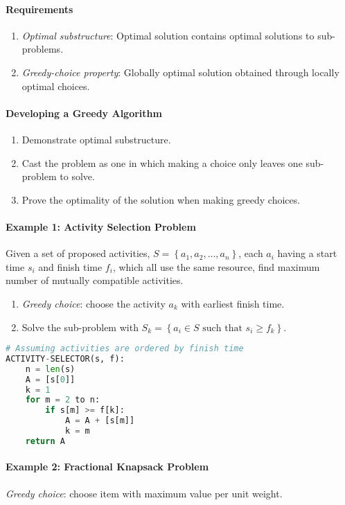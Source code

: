 \documentclass[twocolumn,english]{article}
\begin{document}
\paragraph{Requirements}
\begin{enumerate}
\item \emph{Optimal substructure}: Optimal solution contains optimal solutions
to sub-problems.
\item \emph{Greedy-choice property}: Globally optimal solution obtained
through locally optimal choices.
\end{enumerate}

\paragraph{Developing a Greedy Algorithm}
\begin{enumerate}
\item Demonstrate optimal substructure.
\item Cast the problem as one in which making a choice only leaves one sub-problem
to solve.
\item Prove the optimality of the solution when making greedy choices.
\end{enumerate}

\paragraph{Example 1: Activity Selection Problem}

Given a set of proposed activities, $S=\left\{ a_{1},a_{2},\dots,a_{n}\right\} $,
each $a_{i}$ having a start time $s_{i}$ and finish time $f_{i}$,
which all use the same resource, find maximum number of mutually compatible
activities.
\begin{enumerate}
\item \emph{Greedy choice}: choose the activity $a_{k}$ with earliest finish
time.
\item Solve the sub-problem with $S_{k}=\left\{ a_{i}\in S\text{ such that }s_{i}\geq f_{k}\right\} $.
\end{enumerate}
\begin{lstlisting}[language=Python,basicstyle={\footnotesize\ttfamily},tabsize=4,frame=single]
# Assuming activities are ordered by finish time
ACTIVITY-SELECTOR(s, f):
	n = len(s)
	A = [s[0]]
	k = 1
	for m = 2 to n:
		if s[m] >= f[k]:
			A = A + [s[m]]
			k = m
	return A
\end{lstlisting}

\paragraph{Example 2: Fractional Knapsack Problem}

\emph{Greedy choice}: choose item with maximum value per unit weight.
\end{document}
